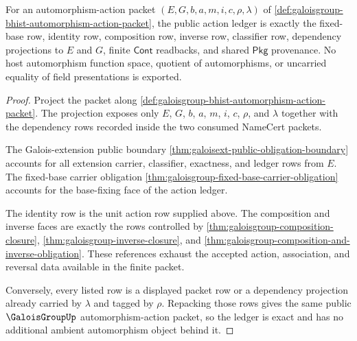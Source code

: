 \begin{theorem}
\label{thm:galoisgroup-action-ledger-exactness}
For an automorphism-action packet $(E,G,b,a,m,i,c,\rho,\lambda)$ of
\autoref{def:galoisgroup-bhist-automorphism-action-packet}, the public action
ledger is exactly the fixed-base row, identity row, composition row, inverse
row, classifier row, dependency projections to $E$ and $G$, finite
$\mathsf{Cont}$ readbacks, and shared $\mathsf{Pkg}$ provenance. No host
automorphism function space, quotient of automorphisms, or uncarried equality
of field presentations is exported.
\end{theorem}
\begin{proof}
Project the packet along
\autoref{def:galoisgroup-bhist-automorphism-action-packet}. The projection
exposes only $E$, $G$, $b$, $a$, $m$, $i$, $c$, $\rho$, and $\lambda$ together
with the dependency rows recorded inside the two consumed NameCert packets.

The Galois-extension public boundary
\autoref{thm:galoisext-public-obligation-boundary} accounts for all extension
carrier, classifier, exactness, and ledger rows from $E$. The fixed-base carrier
obligation \autoref{thm:galoisgroup-fixed-base-carrier-obligation} accounts for
the base-fixing face of the action ledger.

The identity row is the unit action row supplied above. The composition and
inverse faces are exactly the rows controlled by
\autoref{thm:galoisgroup-composition-closure},
\autoref{thm:galoisgroup-inverse-closure}, and
\autoref{thm:galoisgroup-composition-and-inverse-obligation}. These references
exhaust the accepted action, association, and reversal data available in the
finite packet.

Conversely, every listed row is a displayed packet row or a dependency
projection already carried by $\lambda$ and tagged by $\rho$. Repacking those
rows gives the same public $\GaloisGroupUp$ automorphism-action packet, so the
ledger is exact and has no additional ambient automorphism object behind it.
\end{proof}

